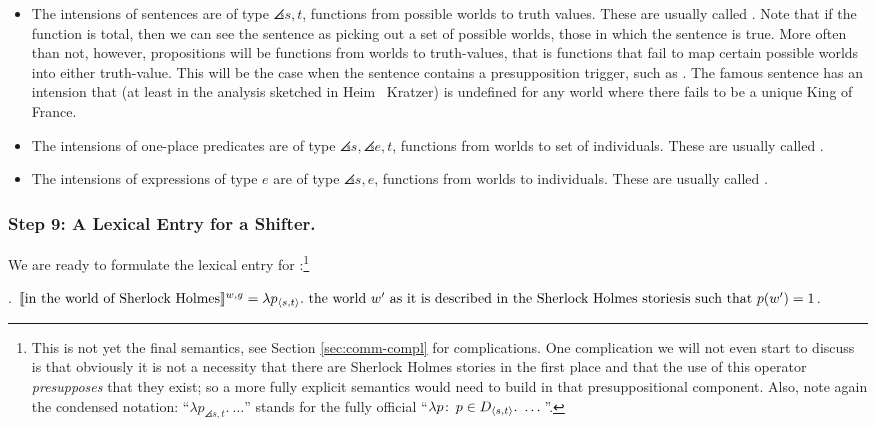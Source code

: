 \begin{itemize}
	\item The intensions of sentences are of type $\angles{s,t}$, functions from possible worlds to truth values. These are usually called . Note that if the function is total, then we can see the sentence as picking out a set of possible worlds, those in which the sentence is true. More often than not, however, propositions will be  functions from worlds to truth-values, that is functions that fail to map certain possible worlds into either truth-value. This will be the case when the sentence contains a presupposition trigger, such as . The famous sentence  has an intension that (at least in the analysis sketched in Heim \amp\ Kratzer) is undefined for any world where there fails to be a unique King of France. 
	\item The intensions of one-place predicates are of type $\angles{s,\angles{e,t}}$, functions from worlds to set of individuals. These are usually called . 
	\item The intensions of expressions of type $e$ are of type $\angles{s,e}$, functions from worlds to individuals. These are usually called . 
\end{itemize}

\subsubsection{Step 9: A Lexical Entry for a Shifter.} \label{sec:lexic-entry-expr}

We are ready to formulate the lexical entry for :\footnote{This is not yet the final semantics, see Section \ref{sec:comm-compl} for complications. One complication we will not even start to discuss is that obviously it is not a necessity that there are Sherlock Holmes stories in the first place and that the use of this operator \emph{presupposes} that they exist; so a more fully explicit semantics would need to build in that presuppositional component. Also, note again the condensed notation: ``$\lambda p_{\angles{s,t}}.\ \dots$'' stands for the fully official ``$\lambda p\colon\thinspace p \in D_{\langle s,t \rangle}.\ \dots$''.}

\ex. $\llbracket \mbox{in the world of Sherlock Holmes} \rrbracket^{w,g} =\\
\lambda p_{\langle s,t \rangle}.\ \mbox{the world } w' \mbox{ as it is described in the Sherlock Holmes stories}\\
\mbox{is such that } p(w') = 1$.

